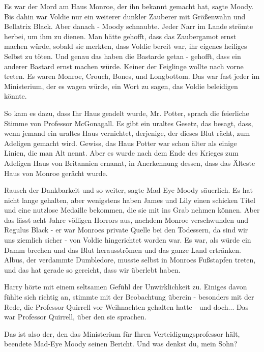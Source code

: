 \glqq{}Es war der Mord am Haus Monroe, der ihn bekannt gemacht hat\grqq{}, sagte
Moody. \glqq{}Bis dahin war Voldie nur ein weiterer dunkler Zauberer mit
Größenwahn und Bellatrix Black. Aber danach -\grqq{} Moody schnaubte. \glqq{}
Jeder Narr im Lande strömte herbei, um ihm zu dienen. Man hätte gehofft, dass
das Zaubergamot ernst machen würde, sobald sie merkten, dass Voldie bereit war,
ihr eigenes heiliges Selbst zu töten. Und genau das haben die Bastarde getan -
gehofft, dass ein anderer Bastard ernst machen würde. Keiner der Feiglinge
wollte nach vorne treten. Es waren Monroe, Crouch, Bones, und Longbottom. Das
war fast jeder im Ministerium, der es wagen würde, ein Wort zu sagen, das Voldie
beleidigen könnte.\grqq{}

\glqq{}So kam es dazu, dass Ihr Haus geadelt wurde, Mr. Potter\grqq{}, sprach die
feierliche Stimme von Professor McGonagall. \glqq{}Es gibt ein uraltes Gesetz,
das besagt, dass, wenn jemand ein uraltes Haus vernichtet, derjenige, der dieses
Blut rächt, zum Adeligen gemacht wird. Gewiss, das Haus Potter war schon älter
als einige Linien, die man Alt nennt. Aber es wurde nach dem Ende des Krieges
zum Adeligen Haus von Britannien ernannt, in Anerkennung dessen, dass das
Älteste Haus von Monroe gerächt wurde.\grqq{}

\glqq{}Rausch der Dankbarkeit und so weiter\grqq{}, sagte Mad-Eye Moody
säuerlich. \glqq{}Es hat nicht lange gehalten, aber wenigstens haben James und
Lily einen schicken Titel und eine nutzlose Medaille bekommen, die sie mit ins
Grab nehmen können. Aber das lässt acht Jahre völligen Horrors aus, nachdem
Monroe verschwunden und Regulus Black - er war Monroes private Quelle bei den
Todessern, da sind wir uns ziemlich sicher - von Voldie hingerichtet worden war.
Es war, als würde ein Damm brechen und das Blut herausströmen und das ganze Land
ertränken. Albus, der verdammte Dumbledore, musste selbst in Monroes Fußstapfen
treten, und das hat gerade so gereicht, dass wir überlebt haben.\grqq{}

Harry hörte mit einem seltsamen Gefühl der Unwirklichkeit zu. Einiges davon
fühlte sich richtig an, stimmte mit der Beobachtung überein - besonders mit der
Rede, die Professor Quirrell vor Weihnachten gehalten hatte - und doch... Das
war Professor Quirrell, über den sie sprachen.

\glqq{}Das ist also der, den das Ministerium für Ihren Verteidigungsprofessor
hält\grqq{}, beendete Mad-Eye Moody seinen Bericht. \glqq{}Und was denkst du,
mein Sohn?\grqq{}


